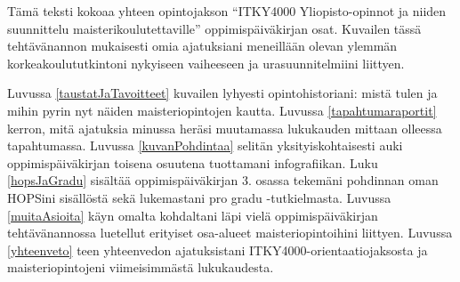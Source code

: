 \documentclass[utf8]{gradu3}
\begin{document}
Tämä teksti kokoaa yhteen opintojakson ``ITKY4000 Yliopisto-opinnot ja niiden
suunnittelu maisterikoulutettaville'' oppimispäiväkirjan osat. Kuvailen tässä
tehtävänannon mukaisesti omia ajatuksiani meneillään olevan ylemmän
korkeakoulututkintoni nykyiseen vaiheeseen ja urasuunnitelmiini liittyen.



Luvussa \ref{taustatJaTavoitteet} kuvailen lyhyesti opintohistoriani: mistä
tulen ja mihin pyrin nyt näiden maisteriopintojen kautta.
%
%
%
Luvussa \ref{tapahtumaraportit} kerron, mitä ajatuksia minussa heräsi muutamassa
lukukauden mittaan olleessa tapahtumassa.
%
Luvussa \ref{kuvanPohdintaa} selitän yksityiskohtaisesti auki oppimispäiväkirjan
toisena osuutena tuottamani infografiikan.
%
Luku \ref{hopsJaGradu} sisältää oppimispäiväkirjan 3. osassa tekemäni pohdinnan
oman HOPSini sisällöstä sekä lukemastani pro gradu -tutkielmasta.
%
Luvussa \ref{muitaAsioita} käyn omalta kohdaltani läpi vielä oppimispäiväkirjan
tehtävänannossa luetellut erityiset osa-alueet maisteriopintoihini liittyen.
%
Luvussa \ref{yhteenveto} teen yhteenvedon ajatuksistani
ITKY4000-orientaatiojaksosta ja maisteriopintojeni viimeisimmästä lukukaudesta.

\end{document}
